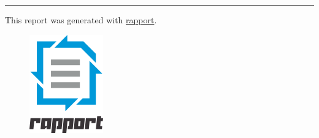 \documentclass[]{article}
\makeatletter
\def\maxwidth{\ifdim\Gin@nat@width>\linewidth\linewidth
\else\Gin@nat@width\fi}
\let\Oldincludegraphics\includegraphics
\renewcommand{\includegraphics}[1]{\Oldincludegraphics[width=\maxwidth]{#1}}
\makeatother
\begin{document}
\begin{center}\rule{3in}{0.4pt}\end{center}

This report was generated with
\href{http://rapport-package.info/}{rapport}.

\begin{figure}[htbp]
\centering
\includegraphics{images/rapport.png}
\caption{}
\end{figure}
\end{document}
